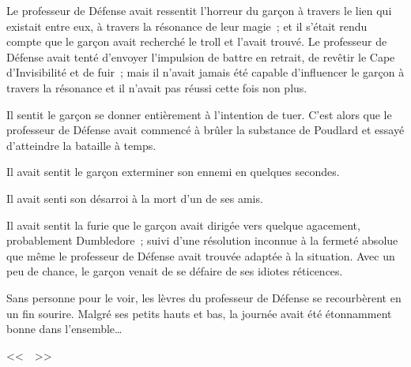 Le professeur de Défense avait ressentit l'horreur du garçon à travers le lien qui existait entre eux, à travers la résonance de leur magie~; et il s'était rendu compte que le garçon avait recherché le troll et l'avait trouvé. Le professeur de Défense avait tenté d'envoyer l'impulsion de battre en retrait, de revêtir le Cape d'Invisibilité et de fuir~; mais il n'avait jamais été capable d'influencer le garçon à travers la résonance et il n'avait pas réussi cette fois non plus.

Il sentit le garçon se donner entièrement à l'intention de tuer. C'est alors que le professeur de Défense avait commencé à brûler la substance de Poudlard et essayé d'atteindre la bataille à temps.

Il avait sentit le garçon exterminer son ennemi en quelques secondes.

Il avait senti son désarroi à la mort d'un de ses amis.

Il avait sentit la furie que le garçon avait dirigée vers quelque agacement, probablement Dumbledore~; suivi d'une résolution inconnue à la fermeté absolue que même le professeur de Défense avait trouvée adaptée à la situation. Avec un peu de chance, le garçon venait de se défaire de ses idiotes réticences.

Sans personne pour le voir, les lèvres du professeur de Défense se recourbèrent en un fin sourire. Malgré ses petits hauts et bas, la journée avait été étonnamment bonne dans l'ensemble…

<<~~>> 

